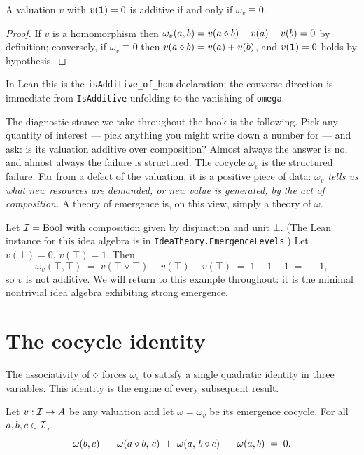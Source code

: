 \begin{lemma}\label{lem:additivity}
A valuation $v$ with $v(\mathbf{1}) = 0$ is additive if and only if $\omega_v
\equiv 0$.
\end{lemma}

\begin{proof}
If $v$ is a homomorphism then $\omega_v(a,b) = v(a\mathbin{\diamond} b) - v(a) - v(b) =
0$ by definition; conversely, if $\omega_v \equiv 0$ then $v(a\mathbin{\diamond} b) =
v(a) + v(b)$, and $v(\mathbf{1}) = 0$ holds by hypothesis.
\end{proof}

In Lean this is the \texttt{isAdditive\_of\_hom} declaration; the converse
direction is immediate from \texttt{IsAdditive} unfolding to the vanishing of
\texttt{omega}.

The diagnostic stance we take throughout the book is the following. Pick any
quantity of interest --- pick anything you might write down a number for ---
and ask: is its valuation additive over composition? Almost always the
answer is no, and almost always the failure is structured. The cocycle
$\omega_v$ is the structured failure. Far from a defect of the valuation, it
is a positive piece of data: \emph{$\omega_v$ tells us what new resources are
demanded, or new value is generated, by the act of composition.} A theory of
emergence is, on this view, simply a theory of $\omega$.

\begin{example}\label{ex:bool}
Let $\mathcal{I} = \mathrm{Bool}$ with composition given by disjunction and unit
$\bot$. (The Lean instance for this idea algebra is in
\texttt{IdeaTheory.EmergenceLevels}.) Let $v(\bot) = 0$, $v(\top) = 1$. Then
\[
  \omega_v(\top,\top) \;=\; v(\top\vee\top) - v(\top) - v(\top) \;=\; 1 - 1
  - 1 \;=\; -1,
\]
so $v$ is not additive. We will return to this example throughout: it is the
minimal nontrivial idea algebra exhibiting strong emergence.
\end{example}

\section{The cocycle identity}\label{sec:cocycle}

The associativity of $\mathbin{\diamond}$ forces $\omega_v$ to satisfy a single
quadratic identity in three variables. This identity is the engine of every
subsequent result.

\begin{theorem}[Cocycle identity, $\partial\omega = 0$]\label{thm:cocycle}
Let $v : \mathcal{I} \to A$ be any valuation and let $\omega = \omega_v$ be its
emergence cocycle. For all $a,b,c \in \mathcal{I}$,
\begin{equation}\label{eq:cocycle}
  \omega(b,c) \;-\; \omega(a\mathbin{\diamond} b,\,c) \;+\; \omega(a,\,b\mathbin{\diamond} c)
  \;-\; \omega(a,b) \;=\; 0.
\end{equation}
\end{theorem}

